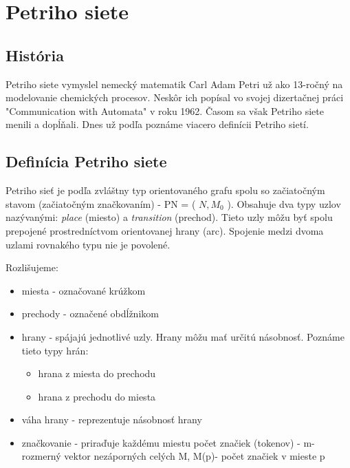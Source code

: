 





\section{Petriho siete}


\subsection{História}
Petriho siete vymyslel nemecký matematik Carl Adam Petri už ako 13-ročný na modelovanie chemických procesov. Neskôr ich popísal vo svojej dizertačnej práci "Communication with Automata" \cite{petri} v roku 1962. Časom sa však Petriho siete menili a dopĺňali. Dnes už podľa \cite{gabova_kniha} poznáme viacero definícii Petriho sietí. 


\subsection{Definícia Petriho siete}
Petriho sieť je podľa  \cite{desel} zvláštny typ orientovaného grafu spolu so začiatočným stavom (začiatočným značkovaním) - PN = ( $N, M_{0}$ ). 
Obsahuje dva typy uzlov nazývanými: \emph{place}  (miesto) a \emph{transition} (prechod). Tieto uzly môžu byť spolu prepojené prostredníctvom orientovanej hrany (arc). Spojenie medzi dvoma uzlami rovnakého typu nie je povolené.

\noindent Rozlišujeme:
\begin{itemize}
	\item miesta - označované krúžkom 
	\item prechody - označené obdĺžnikom
	\item hrany - spájajú jednotlivé uzly. Hrany môžu mať určitú násobnosť. Poznáme tieto typy hrán: 
	\begin{itemize}
		\item hrana z miesta do prechodu
		\item hrana z prechodu do miesta
	\end{itemize}
	\item váha hrany - reprezentuje násobnosť hrany
	\item značkovanie - priraďuje každému miestu počet značiek (tokenov) - m-rozmerný vektor nezáporných celých M, M(p)- počet značiek v mieste p 
\end{itemize}




